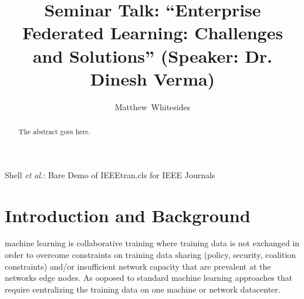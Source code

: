 \documentclass[journal,onecolumn]{IEEEtran}
\begin{document}
%
\title{Seminar Talk: ``Enterprise Federated Learning: Challenges and Solutions'' (Speaker: Dr. Dinesh Verma)}

%
%
%
\author{Matthew~Whitesides}%

%
{Shell \MakeLowercase{\textit{et al.}}: Bare Demo of IEEEtran.cls for IEEE Journals}

\maketitle

\begin{abstract}
The abstract goes here.
\end{abstract}


\IEEEpeerreviewmaketitle

\section{Introduction and Background}

 machine learning is collaborative training where training data is not exchanged in order to overcome constraints on training data sharing (policy, security, coalition constraints) and/or insufficient network capacity that are prevalent at the networks edge nodes. As ooposed to standard machine learning approaches that require centralizing the training data on one machine or network datacenter.
\end{document}
